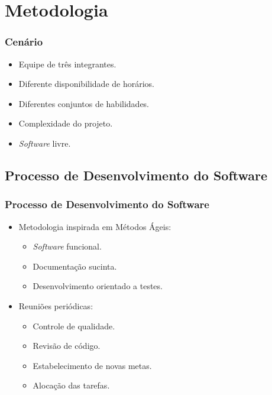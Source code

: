 \section{Metodologia}

\frame
{
\frametitle{Cenário}
\begin{itemize}
	\item Equipe de três integrantes.
	\item Diferente disponibilidade de horários.
	\item Diferentes conjuntos de habilidades.
	\item Complexidade do projeto.
	\item \emph{Software} livre.
\end{itemize}
}

\subsection{Processo de Desenvolvimento do Software}
\frame
{
\frametitle{Processo de Desenvolvimento do Software}
\begin{itemize}
	\item Metodologia inspirada em Métodos Ágeis:
	\begin{itemize}
		\item \emph{Software} funcional.
		\item Documentação sucinta.
		\item Desenvolvimento orientado a testes.
	\end{itemize}
	\item Reuniões periódicas:
	\begin{itemize}
		\item Controle de qualidade.
		\item Revisão de código.
		\item Estabelecimento de novas metas.
		\item Alocação das tarefas.
	\end{itemize}
\end{itemize}
}
\frame
